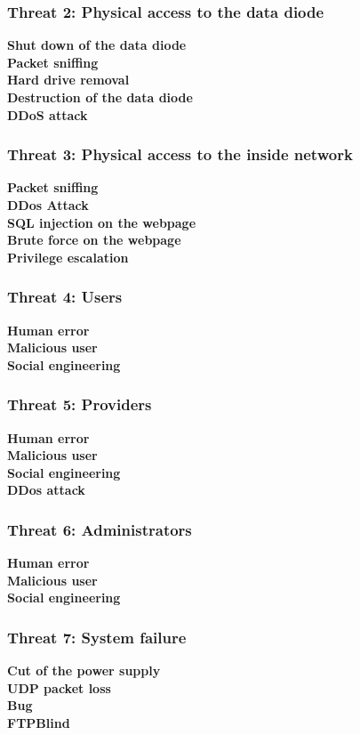 \documentclass[a4paper,11pt]{article}
\begin{document}
\subsubsection{Threat 2: Physical access to the data diode}
\textbf{Shut down of the data diode}\\
\textbf{Packet sniffing}\\
\textbf{Hard drive removal}\\
\textbf{Destruction of the data diode}\\
\textbf{DDoS attack}\\
\subsubsection{Threat 3: Physical access to the inside network }
\textbf{Packet sniffing}\\
\textbf{DDos Attack}\\
\textbf{SQL injection on the webpage}\\
\textbf{Brute force on the webpage}\\
\textbf{Privilege escalation}\\
\subsubsection{Threat 4: Users}
\textbf{Human error}\\
\textbf{Malicious user}\\
\textbf{Social engineering}\\
\subsubsection{Threat 5: Providers}
\textbf{Human error}\\
\textbf{Malicious user}\\
\textbf{Social engineering}\\
\textbf{DDos attack}\\
\subsubsection{Threat 6: Administrators}
\textbf{Human error}\\
\textbf{Malicious user}\\
\textbf{Social engineering}\\
\subsubsection{Threat 7: System failure}
\textbf{Cut of the power supply}\\
\textbf{UDP packet loss}\\
\textbf{Bug}\\
\textbf{FTPBlind}\\
\end{document}
